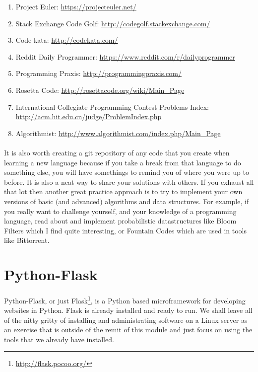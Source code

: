 \documentclass[12pt, a4paper, twoside]{book}
\begin{document}
\begin{enumerate}
\item Project Euler: \url{https://projecteuler.net/}
\item Stack Exchange Code Golf: \url{http://codegolf.stackexchange.com/}
\item Code kata: \url{http://codekata.com/}
\item Reddit Daily Programmer: \url{https://www.reddit.com/r/dailyprogrammer}
\item Programming Praxis: \url{http://programmingpraxis.com/}
\item Rosetta Code: \url{http://rosettacode.org/wiki/Main_Page}
\item International Collegiate Programming Contest Problems Index: \url{http://acm.hit.edu.cn/judge/ProblemIndex.php}
\item Algorithmist: \url{http://www.algorithmist.com/index.php/Main_Page}
\end{enumerate}

\paragraph{} It is also worth creating a git repository of any code that you create when learning a new language because if you take a break from that language to do something else, you will have somethings to remind you of where you were up to before. It is also a neat way to share your solutions with others. If you exhaust all that lot then another great practice approach is to try to implement your own versions of basic (and advanced) algorithms and data structures. For example, if you really want to challenge yourself, and your knowledge of a programming language, read about and implement probabilistic datastructures like Bloom Filters which I find quite interesting, or Fountain Codes which are used in tools like Bittorrent.

\section{Python-Flask}
\label{python-flask}
\paragraph{} Python-Flask, or just Flask\footnote{\url{http://flask.pocoo.org/}}, is a Python based microframework for developing websites in Python. Flask is already installed and ready to run. We shall leave all of the nitty gritty of installing and administrating software on a Linux server as an exercise that is outside of the remit of this module and just focus on using the tools that we already have installed.
\end{document}
